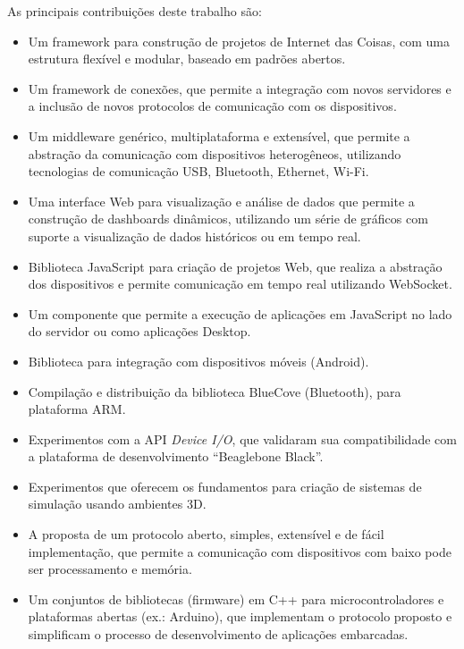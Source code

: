 As principais contribuições deste trabalho são:
\begin{itemize}
\item Um framework para construção de projetos de Internet das Coisas, com
uma estrutura flexível e modular, baseado em padrões abertos.
\item Um framework de conexões, que permite a integração com novos servidores
e a inclusão de novos protocolos de comunicação com os dispositivos.
\item Um middleware genérico, multiplataforma e extensível, que permite
a abstração da comunicação com dispositivos heterogêneos, utilizando
tecnologias de comunicação USB, Bluetooth, Ethernet, Wi-Fi.
\item Uma interface Web para visualização e análise de dados que permite
a construção de dashboards dinâmicos, utilizando um série de gráficos
com suporte a visualização de dados históricos ou em tempo real.
\item Biblioteca JavaScript para criação de projetos Web, que realiza a
abstração dos dispositivos e permite comunicação em tempo real utilizando
WebSocket.
\item Um componente que permite a execução de aplicações em JavaScript no
lado do servidor ou como aplicações Desktop.
\item Biblioteca para integração com dispositivos móveis (Android).
\item Compilação e distribuição da biblioteca BlueCove (Bluetooth), para
plataforma ARM.
\item Experimentos com a API \emph{Device I/O}, que validaram sua compatibilidade
com a plataforma de desenvolvimento ``Beaglebone Black''.
\item Experimentos que oferecem os fundamentos para criação de sistemas
de simulação usando ambientes 3D.
\item A proposta de um protocolo aberto, simples, extensível e de fácil
implementação, que permite a comunicação com dispositivos com baixo
pode ser processamento e memória.
\item Um conjuntos de bibliotecas (firmware) em C++ para microcontroladores
e plataformas abertas (ex.: Arduino), que implementam o protocolo
proposto e simplificam o processo de desenvolvimento de aplicações
embarcadas. 
\end{itemize}

